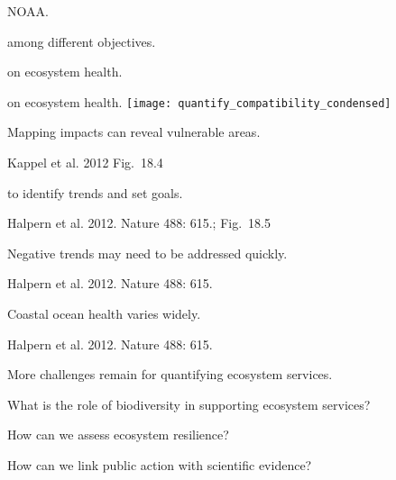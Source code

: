 \documentclass[t]{beamer}
\begin{document}

{
\begin{frame}[b]
\hfill\tiny NOAA.
\end{frame}
}



{
\begin{frame}[t]{ among different objectives.}
\end{frame}
}

{
\begin{frame}[t]{ on ecosystem health.}
\end{frame}
}

\begin{frame}[t]{ on ecosystem health.}
	\texttt{[image: quantify\_compatibility\_condensed]}
\end{frame}

{
\begin{frame}[b]{Mapping impacts can reveal vulnerable areas.}

\tiny Kappel et al. 2012 \hfill Fig.~18.4
\end{frame}
}

{
\begin{frame}[b]{ to identify trends and set goals.}

\tiny\hfill Halpern et al. 2012. Nature 488: 615.; Fig.~18.5
\end{frame}
}

{
\begin{frame}[b]{Negative trends may need to be addressed quickly.}

\tiny\hfill Halpern et al. 2012. Nature 488: 615.
\end{frame}
}

{
\begin{frame}[b]{Coastal ocean health varies widely.}

\tiny\hfill Halpern et al. 2012. Nature 488: 615.
\end{frame}
}


\begin{frame}[t]{More challenges remain for quantifying ecosystem services.}

\hangpara What is the role of biodiversity in supporting ecosystem services?

\hangpara How can we assess ecosystem resilience?

\hangpara How can we link public action with scientific evidence?

\end{frame}
\end{document}
